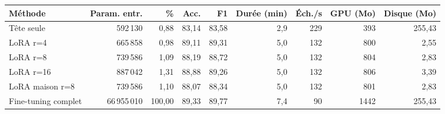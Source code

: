 \begin{tabular}{lrrrrrrrr}
\toprule
Méthode & Param. entr. & \% & Acc. & F1 & Durée (min) & Éch./s & GPU (Mo) & Disque (Mo) \\
\midrule
Tête seule & 592\,130 & 0{,}88 & 83{,}14 & 83{,}58 & 2{,}9 & 229 & 393 & 255{,}43 \\
LoRA r=4 & 665\,858 & 0{,}98 & 89{,}11 & 89{,}31 & 5{,}0 & 132 & 800 & 2{,}55 \\
LoRA r=8 & 739\,586 & 1{,}09 & 88{,}19 & 88{,}72 & 5{,}0 & 132 & 804 & 2{,}83 \\
LoRA r=16 & 887\,042 & 1{,}31 & 88{,}88 & 89{,}26 & 5{,}0 & 132 & 806 & 3{,}39 \\
LoRA maison r=8 & 739\,586 & 1{,}10 & 88{,}07 & 88{,}34 & 5{,}0 & 132 & 801 & 2{,}83 \\
Fine-tuning complet & 66\,955\,010 & 100{,}00 & 89{,}33 & 89{,}77 & 7{,}4 & 90 & 1442 & 255{,}43 \\
\bottomrule
\end{tabular}